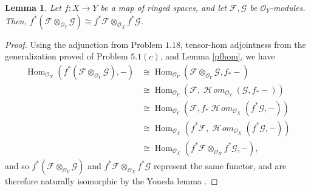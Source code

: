 \documentclass[12pt,letterpaper]{article}
\newtheorem{lemma}{Lemma}[section]
\theoremstyle{definition}
\theoremstyle{remark}
\numberwithin{equation}{section}
\numberwithin{figure}{problem}
\DeclareMathOperator{\Hom}{Hom}
\newcommand{\FF}{\mathscr{F}}
\newcommand{\GG}{\mathscr{G}}
\newcommand{\OO}{\mathcal{O}}
\DeclareMathOperator{\HHom}{\mathscr{H}\!\mathit{om}}
\begin{document}
\begin{lemma}\label{tpinvimg}
  Let $f\colon X \to Y$ be a map of ringed spaces, and let $\FF,\GG$ be $\OO_Y$-modules. Then, $f^*(\FF \otimes_{\OO_Y} \GG) \cong f^*\FF \otimes_{\OO_X} f^*\GG$.
\end{lemma}
\begin{proof}
  Using the adjunction from Problem $1.18$, tensor-hom adjointness from the generalization proved of Problem $5.1(c)$, and Lemma \ref{pfhom}, we have
  \begin{align*}
    \Hom_{\OO_X}(f^*(\FF \otimes_{\OO_Y} \GG),-) &\cong \Hom_{\OO_Y}(\FF \otimes_{\OO_Y} \GG,f_*-)\\
    &\cong \Hom_{\OO_Y}(\FF,\HHom_{\OO_Y}(\GG,f_*-))\\
    &\cong \Hom_{\OO_Y}(\FF,f_*\HHom_{\OO_X}(f^*\GG,-))\\
    &\cong \Hom_{\OO_X}(f^*\FF,\HHom_{\OO_X}(f^*\GG,-))\\
    &\cong \Hom_{\OO_X}(f^*\FF \otimes_{\OO_X} f^*\GG,-),
  \end{align*}
  and so $f^*(\FF \otimes_{\OO_Y} \GG)$ and $f^*\FF \otimes_{\OO_X} f^*\GG$ represent the same functor, and are therefore naturally isomorphic by the Yoneda lemma \cite[p.~61]{Mac98}.
\end{proof}
\end{document}

